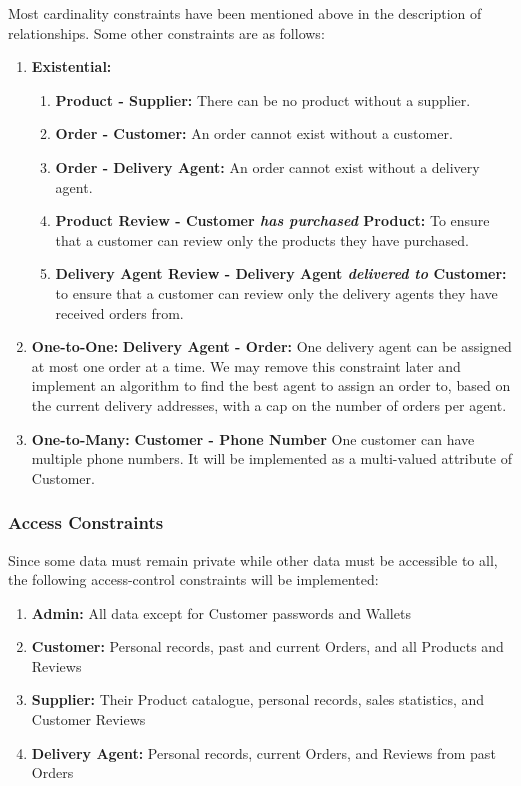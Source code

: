\documentclass[12pt]{report}
\begin{document}
    Most cardinality constraints have been mentioned above in the description of relationships.
    Some other constraints are as follows:
    \begin{enumerate}
        \item \textbf{Existential:}
        \begin{enumerate}
            \item \textbf{Product - Supplier:} There can be no product without a supplier.
            \item \textbf{Order - Customer:} An order cannot exist without a customer.
            \item \textbf{Order - Delivery Agent:} An order cannot exist without a delivery agent.
            \item \textbf{Product Review - Customer \textit{has purchased} Product:} To ensure that a customer can review only the products they have purchased.
            \item \textbf{Delivery Agent Review - Delivery Agent \textit{delivered to} Customer:} to ensure that a customer can review only the delivery agents they have received orders from.
        \end{enumerate}
        \item \textbf{One-to-One:}
        \textbf{Delivery Agent - Order:} One delivery agent can be assigned at most one order at a time.
        We may remove this constraint later and implement an algorithm to find the best agent to assign an order to, based on the current delivery addresses, with a cap on the number of orders per agent.
        \item \textbf{One-to-Many:}
        \textbf{Customer - Phone Number} One customer can have multiple phone numbers.
        It will be implemented as a multi-valued attribute of Customer.
    \end{enumerate}

    \subsubsection*{Access Constraints}
    Since some data must remain private while other data must be accessible to all, the following access-control constraints will be implemented:
    \begin{enumerate}
        \item \textbf{Admin:} All data except for Customer passwords and Wallets
        \item \textbf{Customer:} Personal records, past and current Orders, and all Products and Reviews
        \item \textbf{Supplier:} Their Product catalogue, personal records, sales statistics, and Customer Reviews
        \item \textbf{Delivery Agent:} Personal records, current Orders, and Reviews from past Orders
    \end{enumerate}
\end{document}

